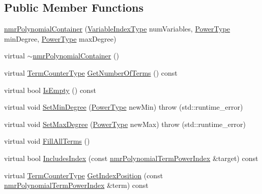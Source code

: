 \subsection*{Public Member Functions}
\begin{DoxyCompactItemize}
\item 
\hyperlink{classnmr_polynomial_container_a64d893a4d10133f60228dfe6572c4207}{nmr\-Polynomial\-Container} (\hyperlink{classnmr_polynomial_base_aae95477e451ddc7d3ee3f41cbdaadde2}{Variable\-Index\-Type} num\-Variables, \hyperlink{classnmr_polynomial_base_a58607c884bf2e6725a77ed4d9e14ba26}{Power\-Type} min\-Degree, \hyperlink{classnmr_polynomial_base_a58607c884bf2e6725a77ed4d9e14ba26}{Power\-Type} max\-Degree)
\item 
virtual \hyperlink{classnmr_polynomial_container_a8a8e9cbcf9b278f74ca644a2be8773c5}{$\sim$nmr\-Polynomial\-Container} ()
\item 
virtual \hyperlink{classnmr_polynomial_base_a4b0abd66b12b6f5bfb30d0eb1607e661}{Term\-Counter\-Type} \hyperlink{classnmr_polynomial_container_a155c42ad638239ba889ca69739287e85}{Get\-Number\-Of\-Terms} () const 
\item 
virtual bool \hyperlink{classnmr_polynomial_container_afec06d447808f6751b9e28b168a4ff60}{Is\-Empty} () const 
\item 
virtual void \hyperlink{classnmr_polynomial_container_a0f2a6cb8aca5e95073051de89973ab56}{Set\-Min\-Degree} (\hyperlink{classnmr_polynomial_base_a58607c884bf2e6725a77ed4d9e14ba26}{Power\-Type} new\-Min)  throw (std\-::runtime\-\_\-error)
\item 
virtual void \hyperlink{classnmr_polynomial_container_ac54f6c4d7ba690d4b103f051853a61b6}{Set\-Max\-Degree} (\hyperlink{classnmr_polynomial_base_a58607c884bf2e6725a77ed4d9e14ba26}{Power\-Type} new\-Max)  throw (std\-::runtime\-\_\-error)
\item 
virtual void \hyperlink{classnmr_polynomial_container_a0f42d97bb5e37df22b3b940177c05823}{Fill\-All\-Terms} ()
\item 
virtual bool \hyperlink{classnmr_polynomial_container_ad8e23eba5aab3f5cf0f153c054fe7b8a}{Includes\-Index} (const \hyperlink{classnmr_polynomial_term_power_index}{nmr\-Polynomial\-Term\-Power\-Index} \&target) const 
\item 
virtual \hyperlink{classnmr_polynomial_base_a4b0abd66b12b6f5bfb30d0eb1607e661}{Term\-Counter\-Type} \hyperlink{classnmr_polynomial_container_a1ea223fdd9f483c32fed3eb91d880cec}{Get\-Index\-Position} (const \hyperlink{classnmr_polynomial_term_power_index}{nmr\-Polynomial\-Term\-Power\-Index} \&term) const 

\end{DoxyCompactItemize}
